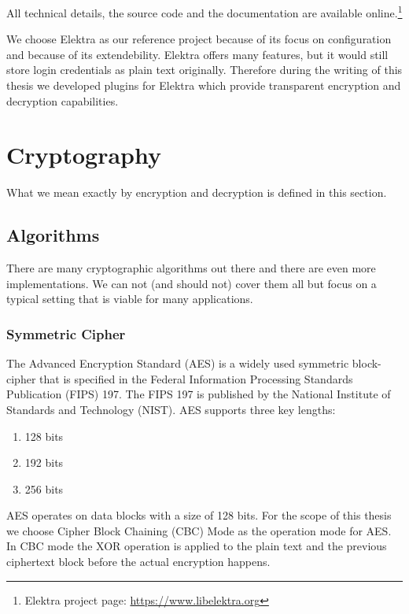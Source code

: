 All technical details, the source code and the documentation are available online.\footnote{Elektra project page: \url{https://www.libelektra.org}}

We choose Elektra as our reference project because of its focus on configuration and because of its extendebility.
Elektra offers many features, but it would still store login credentials as plain text originally.
Therefore during the writing of this thesis we developed plugins for Elektra which provide transparent encryption and decryption capabilities.

\section{Cryptography}

What we mean exactly by encryption and decryption is defined in this section.

\subsection{Algorithms}

There are many cryptographic algorithms out there and there are even more implementations.
We can not (and should not) cover them all but focus on a typical setting that is viable for many applications.

\subsubsection{Symmetric Cipher}

The Advanced Encryption Standard (AES) is a widely used symmetric block-cipher that is specified in the Federal Information Processing Standards Publication (FIPS) 197.
The FIPS 197 is published by the National Institute of Standards and Technology (NIST).\cite{fips197}
AES supports three key lengths:
\begin{enumerate}
  \item 128 bits
  \item 192 bits
  \item 256 bits
\end{enumerate}

AES operates on data blocks with a size of 128 bits.\cite{fips197,stallings2014}
For the scope of this thesis we choose Cipher Block Chaining (CBC) Mode as the operation mode for AES.
In CBC mode the XOR operation is applied to the plain text and the previous ciphertext block before the actual encryption happens.\cite{bruceschneier1996,stallings2014}

